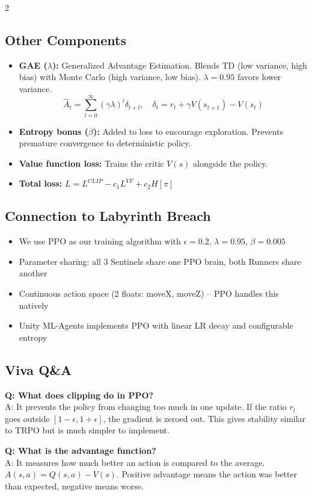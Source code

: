 \documentclass[10pt,a4paper]{article}
\begin{document}
\begin{multicols}{2}
\subsection{Other Components}
\begin{itemize}
\item \textbf{GAE ($\lambda$):} Generalized Advantage Estimation. Blends TD (low variance, high bias) with Monte Carlo (high variance, low bias). $\lambda = 0.95$ favors lower variance.
\[
\hat{A}_t = \sum_{l=0}^{\infty} (\gamma\lambda)^l \delta_{t+l}, \quad \delta_t = r_t + \gamma V(s_{t+1}) - V(s_t)
\]
\item \textbf{Entropy bonus ($\beta$):} Added to loss to encourage exploration. Prevents premature convergence to deterministic policy.
\item \textbf{Value function loss:} Trains the critic $V(s)$ alongside the policy.
\item \textbf{Total loss:} $L = L^{CLIP} - c_1 L^{VF} + c_2 H[\pi]$
\end{itemize}

\subsection{Connection to Labyrinth Breach}
\begin{itemize}
\item We use PPO as our training algorithm with $\epsilon = 0.2$, $\lambda = 0.95$, $\beta = 0.005$
\item Parameter sharing: all 3 Sentinels share one PPO brain, both Runners share another
\item Continuous action space (2 floats: moveX, moveZ) -- PPO handles this natively
\item Unity ML-Agents implements PPO with linear LR decay and configurable entropy
\end{itemize}

\subsection{Viva Q\&A}

\textbf{Q: What does clipping do in PPO?} \\
A: It prevents the policy from changing too much in one update. If the ratio $r_t$ goes outside $[1{-}\epsilon, 1{+}\epsilon]$, the gradient is zeroed out. This gives stability similar to TRPO but is much simpler to implement.

\textbf{Q: What is the advantage function?} \\
A: It measures how much better an action is compared to the average. $A(s,a) = Q(s,a) - V(s)$. Positive advantage means the action was better than expected, negative means worse.


\end{multicols}
\end{document}
